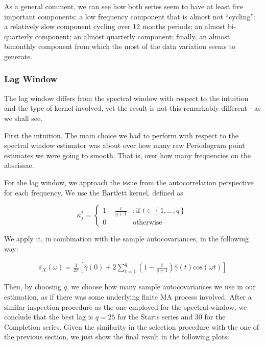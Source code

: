 \documentclass[12pt]{article} %
\begin{document}
As a general comment, we can see how both series seem to have at least five important components: a low frequency component that is almost not ``cycling''; a relatively slow component cycling over 12 months periods; an almost bi-quarterly component; an almost quarterly component; finally, an almost bimonthly component from which the most of the data variation seems to generate.

\subsubsection{Lag Window}

The lag window differs from the spectral window with respect to the intuition and the type of kernel involved, yet the result is not this remarkably different - as we shall see.

First the intuition. The main choice we had to perform with respect to the spectral window estimator was about over how many raw Periodogram point estimates we were going to smooth. That is, over how many frequencies on the abscissae. 

For the lag window, we approach the issue from the autocorrelation perspective for each frequency. We use the Bartlett kernel, defined as

\begin{equation}
\kappa_j^*= \begin{cases}
     1-\frac{t}{q+1}  &: \text{if $t\in\left\{1,...,q\right\}$}\\
     0 &  \text{otherwise}   
\end{cases}
\end{equation}

We apply it, in combination with the sample autocovariances, in the following way:

\begin{equation}
\begin{aligned}
\hat{s}_X(\omega)=\frac{1}{2\pi}\left[\hat{\gamma}(0)+2\sum\limits_{t=1}^{q}\left( 1-\frac{t}{q+1}\right) \hat{\gamma}(t)\text{cos}(\omega t)\right]
\end{aligned}
\end{equation}

Then, by choosing $q$, we choose how many sample autocovariances we use in our estimation, as if there was some underlying finite MA process involved. After a similar inspection procedure as the one employed for the spectral window, we conclude that the best lag is $q=25$ for the Starts series and $30$ for the Completion series. Given the similarity in the selection procedure with the one of the previous section, we just show the final result in the following plots:
\end{document}
